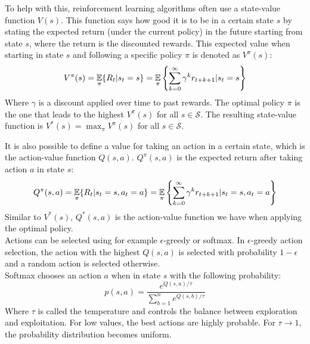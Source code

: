 To help with this, reinforcement learning algorithms often use a state-value function $V(s)$.
This function says how good it is to be in a certain state $s$ by stating the expected return (under the current policy) in the future starting from state $s$, where the return is the discounted rewards.
This expected value when starting in state $s$ and following a specific policy $\pi$ is denoted as $V^\pi(s)$:
\begin{equation}
\label{eq:vpolicy}
V^\pi(s) = \operatorname*{\mathop{{}\mathbb{E}}}_\pi\{R_t \vert s_t=s\}=\operatorname*{\mathop{{}\mathbb{E}}}_\pi\left \{ \sum_{k=0}^{\infty}\gamma^k r_{t+k+1} \vert s_t=s\right \}
\end{equation}
Where $\gamma$ is a discount applied over time to past rewards.
The optimal policy $\pi$ is the one that leads to the highest $V^\pi(s)$ for all $s \in \mathcal{S}$.
The resulting state-value function is $V^*(s) = \max_\pi V^\pi(s)$ for all $s \in \mathcal{S}$.


It is also possible to define a value for taking an action in a certain state, which is the action-value function $Q(s,a)$.
$Q^\pi(s,a)$ is the expected return after taking action $a$ in state $s$:
\begin{equation}
Q^\pi(s,a) = \operatorname*{\mathop{{}\mathbb{E}}}_\pi\{R_t|s_t=s,a_t=a\}=\operatorname*{\mathop{{}\mathbb{E}}}_\pi\left \{ \sum_{k=0}^{\infty}\gamma^k r_{t+k+1} | s_t=s,a_t=a\right \}
\end{equation}
Similar to $V^*(s)$, $Q^*(s,a)$ is the action-value function we have when applying the optimal policy.\\
Actions can be selected using for example $\epsilon$-greedy or softmax. In $\epsilon$-greedy action selection, the action with the highest $Q(s,a)$ is selected with probability $1-\epsilon$ and a random action is selected otherwise.\\
Softmax chooses an action $a$ when in state $s$ with the following probability:
\begin{equation}
p(s,a) = \frac{e^{Q(s,a)/\tau}}{\sum_{b=1}^n e^{Q(s,b)/\tau}}
\end{equation}
Where $\tau$ is called the temperature and controls the balance between exploration and exploitation. For low values, the best actions are highly probable. For $\tau \to 1$, the probability distribution becomes uniform.\\

